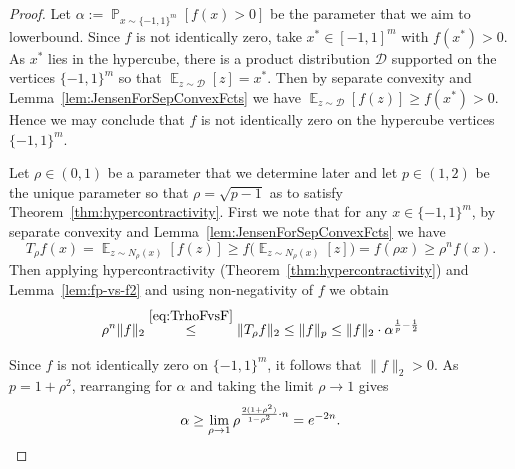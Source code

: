 \documentclass[10pt,a4paper]{amsart}
\def\pazocal#1{\mathcal{#1}}
\newcommand{\E}{\mathop{\mathbb{E}}}
\renewcommand{\Pr}{\mathop{\mathbb{P}}}
\begin{document}
\begin{proof}
  Let $\alpha := \Pr_{x \sim \{ -1,1\}^m}[f(x) > 0]$ be the parameter that we aim to lowerbound.
  Since $f$ is not identically zero, take $x^* \in [-1,1]^m$ with $f(x^*) > 0$. As $x^*$ lies in the hypercube, there is a product distribution $\pazocal{D}$ supported on the vertices $\{ -1,1\}^m$ so that $\E_{z \sim \pazocal{D}}[z] = x^*$. Then by separate convexity and Lemma~\ref{lem:JensenForSepConvexFcts} we have $\E_{z \sim \pazocal{D}}[f(z)] \ge f(x^*) > 0$. Hence we may conclude that $f$ is not identically zero on the hypercube vertices $\{-1,1\}^m$.

  Let $\rho \in (0,1)$ be a parameter that we determine later and let $p \in (1,2)$ be the
  unique parameter so that $\rho = \sqrt{p-1}$ as to satisfy Theorem~\ref{thm:hypercontractivity}.
  First we note that for any $x \in \{-1,1\}^m$, by separate convexity and Lemma~\ref{lem:JensenForSepConvexFcts} we have  
  \begin{equation} \label{eq:TrhoFvsF}
    T_\rho f(x) = \E_{z \sim N_\rho (x)} [f(z)] \ge f\Big(\E_{z \sim N_\rho (x)} [z]\Big) = f(\rho x) \ge \rho^n f(x).
  \end{equation}
  Then applying hypercontractivity (Theorem~\ref{thm:hypercontractivity}) and Lemma~\ref{lem:fp-vs-f2}
  and using non-negativity of $f$ we obtain
  \[
\rho^n\|f\|_2  \stackrel{\eqref{eq:TrhoFvsF}}{\leq} \|T_{\rho}f\|_2 \leq  \|f\|_p \leq \|f\|_2 \cdot \alpha^{\frac{1}{p}-\frac{1}{2}}
  \]
  
  Since $f$ is not identically zero on $\{-1,1\}^m$, it follows that $\|f\|_2 > 0$. As $p = 1+\rho^2$,
  rearranging for $\alpha$ and taking the limit $\rho \to 1$ gives
  \[
   \alpha \geq \lim_{\rho \to 1} \rho^{\frac{2(1+\rho^2)}{1-\rho^2} \cdot n} = e^{-2n}. \qedhere
  \]
\end{proof}
\end{document}
